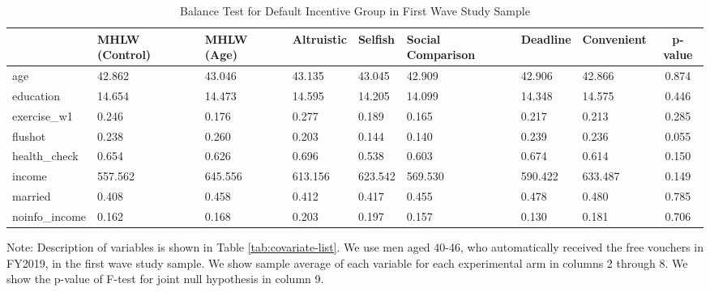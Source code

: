 \begin{table}[!h]

\caption{Balance Test for Default Incentive Group in First Wave Study Sample \label{tab:int-coupon1-balance}}
\centering
\fontsize{9}{11}\selectfont
\begin{threeparttable}
\begin{tabular}[t]{l>{\centering\arraybackslash}p{3em}>{\centering\arraybackslash}p{3em}>{\centering\arraybackslash}p{3em}>{\centering\arraybackslash}p{3em}>{\centering\arraybackslash}p{3em}>{\centering\arraybackslash}p{3em}>{\centering\arraybackslash}p{3em}c}
\toprule
  & MHLW (Control) & MHLW (Age) & Altruistic & Selfish & Social Comparison & Deadline & Convenient & p-value\\
\midrule
age & \num{42.862} & \num{43.046} & \num{43.135} & \num{43.045} & \num{42.909} & \num{42.906} & \num{42.866} & \num{0.874}\\
education & \num{14.654} & \num{14.473} & \num{14.595} & \num{14.205} & \num{14.099} & \num{14.348} & \num{14.575} & \num{0.446}\\
exercise\_w1 & \num{0.246} & \num{0.176} & \num{0.277} & \num{0.189} & \num{0.165} & \num{0.217} & \num{0.213} & \num{0.285}\\
flushot & \num{0.238} & \num{0.260} & \num{0.203} & \num{0.144} & \num{0.140} & \num{0.239} & \num{0.236} & \num{0.055}\\
health\_check & \num{0.654} & \num{0.626} & \num{0.696} & \num{0.538} & \num{0.603} & \num{0.674} & \num{0.614} & \num{0.150}\\
income & \num{557.562} & \num{645.556} & \num{613.156} & \num{623.542} & \num{569.530} & \num{590.422} & \num{633.487} & \num{0.149}\\
married & \num{0.408} & \num{0.458} & \num{0.412} & \num{0.417} & \num{0.455} & \num{0.478} & \num{0.480} & \num{0.785}\\
noinfo\_income & \num{0.162} & \num{0.168} & \num{0.203} & \num{0.197} & \num{0.157} & \num{0.130} & \num{0.181} & \num{0.706}\\
\bottomrule
\end{tabular}
\begin{tablenotes}
\item Note: Description of variables is shown in Table \ref{tab:covariate-list}. We use men aged 40-46, who automatically received the free vouchers in FY2019, in the first wave study sample. We show sample average of each variable for each experimental arm in columns 2 through 8. We show the p-value of F-test for joint null hypothesis in column 9.
\end{tablenotes}
\end{threeparttable}
\end{table}
